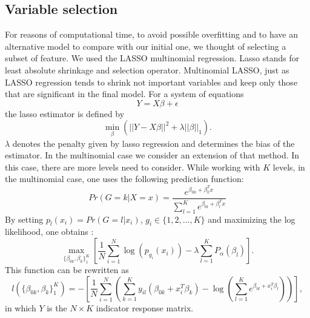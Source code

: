 \subsection{Variable selection}
    For reasons of computational time, to avoid possible overfitting 
    and to have an alternative model to compare with our initial one, 
    we thought of selecting a subset of feature. We used the LASSO 
    multinomial regression. Lasso stands for least absolute shrinkage 
    and selection operator. Multinomial LASSO, just as LASSO regression 
    tends to shrink not important variables and keep only those that 
    are significant in the final model. For a system of equations 
    \begin{equation}
        Y=X\beta +\epsilon  
    \end{equation}
    the lasso estimator is defined by
    \begin{equation}
        \min_\beta(||Y-X\beta||^2+\lambda||\beta||_1).  
    \end{equation} 
    $\lambda$ denotes the penalty given by lasso regression and 
    determines the bias of the estimator. 
    In the multinomial case we consider an extension of that method. 
    In this case, there are more levels need to consider. 
    While working with $K$ levels, in the multinomial case, one uses 
    the following prediction function:
    \begin{equation}
        Pr(G=k|X=x)=\frac{e^{\beta_{0k}+\beta_k^T x}} {\sum_{l=1}^K e^{\beta_{0l}+\beta_l^T x}}  
    \end{equation}
    By setting $p_l(x_i)=Pr(G=l|x_i)$, $g_i\in \{1,2, \hdots, K\}$ and 
    maximizing the log likelihood, one obtains \parencite{Friedman_2010}: 
    \begin{equation}
        \max_{\{\beta_{0k},\beta_k\}_1^K}
        \left[
            \frac{1}{N}\sum_{i=1}^N 
            \log(p_{g_i}(x_i))-\lambda \sum_{l=1}^K P_\alpha (\beta_l) 
        \right].  
    \end{equation}
    This function can be rewritten as
    \begin{equation}
        l(\{\beta_{0k},\beta_k\}_1^K)=
        -\left[ 
            \frac{1}{N} \sum_{i=1}^N
            \left( 
                \sum_{k=1}^Ky_{il}(\beta_{0k}+x_i^T\beta_k)-
                \log\left(
                    \sum_{l=1}^K e^{\beta_{0l}+x_i^T\beta_l}
                \right)
            \right)
        \right],  
    \end{equation} 
    in which $Y$ is the $N\times K$ indicator response matrix. 
